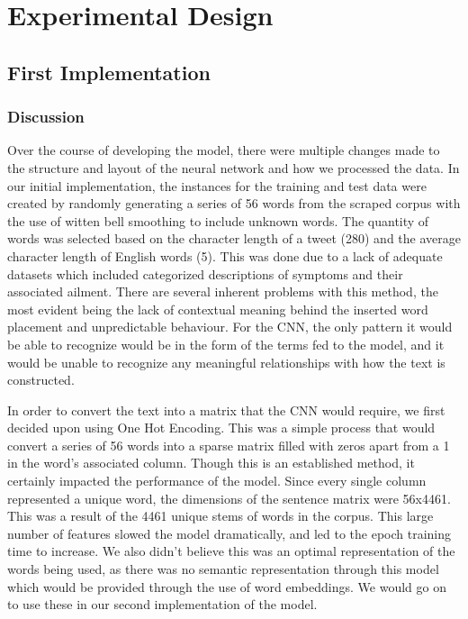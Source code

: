 \documentclass[12pt]{report}
\begin{document}
\chapter{Experimental Design}
\section{First Implementation}
\subsection{Discussion}
Over the course of developing the model, there were multiple changes made to
the structure and layout of the neural network and how we processed the data.
In our initial implementation, the instances for the training and test data
were created by randomly generating a series of 56 words from the scraped
corpus with the use of witten bell smoothing to include unknown words. The
quantity of words was selected based on the character length of a tweet (280)
and the average character length of English words (5). This was done due to a
lack of adequate datasets which included categorized descriptions of symptoms
and their associated ailment. There are several inherent problems with this
method, the most evident being the lack of contextual meaning behind the
inserted word placement and unpredictable behaviour. For the CNN, the only
pattern it would be able to recognize would be in the form of the terms fed to
the model, and it would be unable to recognize any meaningful relationships
with how the text is constructed.

In order to convert the text into a matrix that the CNN would require, we first
decided upon using One Hot Encoding. This was a simple process that would
convert a series of 56 words into a sparse matrix filled with zeros apart from
a 1 in the word’s associated column. Though this is an established method, it
certainly impacted the performance of the model. Since every single column
represented a unique word, the dimensions of the sentence matrix were 56x4461.
This was a result of the 4461 unique stems of words in the corpus. This large
number of features slowed the model dramatically, and led to the epoch training
time to increase. We also didn’t believe this was an optimal representation of
the words being used, as there was no semantic representation through this
model which would be provided through the use of word embeddings. We would go
on to use these in our second implementation of the model.
\end{document}
